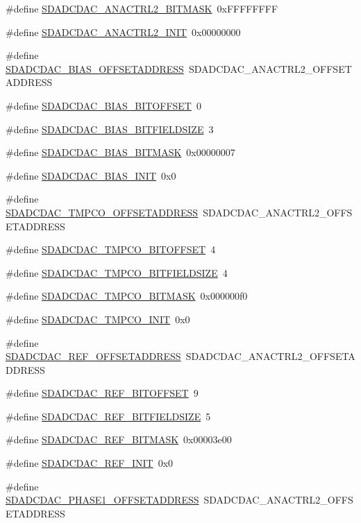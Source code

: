 \begin{DoxyCompactItemize}
\#define \hyperlink{a00569_a7d0c3cf9b4e15c97877a3d58b15452ce}{SDADCDAC\_\-ANACTRL2\_\-BITMASK}~0xFFFFFFFF
\item 
\#define \hyperlink{a00569_a9a738e41ecd6bfd2568003048a353337}{SDADCDAC\_\-ANACTRL2\_\-INIT}~0x00000000
\item 
\#define \hyperlink{a00569_ae3cae9b54afc1c07ed113c5880783f96}{SDADCDAC\_\-BIAS\_\-OFFSETADDRESS}~SDADCDAC\_\-ANACTRL2\_\-OFFSETADDRESS
\item 
\#define \hyperlink{a00569_afc46f898d3bba0222f2237f0da1ba357}{SDADCDAC\_\-BIAS\_\-BITOFFSET}~0
\item 
\#define \hyperlink{a00569_a5efc22ec10b223964b1c40a09b1d3e33}{SDADCDAC\_\-BIAS\_\-BITFIELDSIZE}~3
\item 
\#define \hyperlink{a00569_aed278453408b8d9ef1707d2131f603af}{SDADCDAC\_\-BIAS\_\-BITMASK}~0x00000007
\item 
\#define \hyperlink{a00569_add08cc5b485ecaab5b8659fc1666922b}{SDADCDAC\_\-BIAS\_\-INIT}~0x0
\item 
\#define \hyperlink{a00569_a7aa4c7c5bce1045264f56c69fcef0015}{SDADCDAC\_\-TMPCO\_\-OFFSETADDRESS}~SDADCDAC\_\-ANACTRL2\_\-OFFSETADDRESS
\item 
\#define \hyperlink{a00569_a83937235c0eb733ebec1e8846047d215}{SDADCDAC\_\-TMPCO\_\-BITOFFSET}~4
\item 
\#define \hyperlink{a00569_ae2b5f59fef26485d49400dd73ada6718}{SDADCDAC\_\-TMPCO\_\-BITFIELDSIZE}~4
\item 
\#define \hyperlink{a00569_a23cab56de848a301c059aeef381866ef}{SDADCDAC\_\-TMPCO\_\-BITMASK}~0x000000f0
\item 
\#define \hyperlink{a00569_a04b5ca7767ca84b98cb277b3d5113bc8}{SDADCDAC\_\-TMPCO\_\-INIT}~0x0
\item 
\#define \hyperlink{a00569_a231f8a98f2a552b9ed98f01cf170c5fd}{SDADCDAC\_\-REF\_\-OFFSETADDRESS}~SDADCDAC\_\-ANACTRL2\_\-OFFSETADDRESS
\item 
\#define \hyperlink{a00569_aa13eab77c326d25f216bae47efb6d70a}{SDADCDAC\_\-REF\_\-BITOFFSET}~9
\item 
\#define \hyperlink{a00569_af56004d138333ce9aa8a928ab811e0a1}{SDADCDAC\_\-REF\_\-BITFIELDSIZE}~5
\item 
\#define \hyperlink{a00569_a94e7a2cd11285607ec8618ad4c6e0375}{SDADCDAC\_\-REF\_\-BITMASK}~0x00003e00
\item 
\#define \hyperlink{a00569_a904466191121a24a2346314b6275ecda}{SDADCDAC\_\-REF\_\-INIT}~0x0
\item 
\#define \hyperlink{a00569_ac47743c5518db42ca7f228edec61e831}{SDADCDAC\_\-PHASE1\_\-OFFSETADDRESS}~SDADCDAC\_\-ANACTRL2\_\-OFFSETADDRESS

\end{DoxyCompactItemize}
